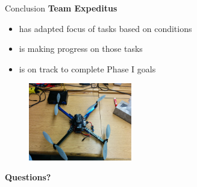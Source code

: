 \documentclass[11pt]{beamer}
\begin{document}
\begin{frame}[t]{Conclusion}
\textbf{Team Expeditus}
\begin{itemize}
\item has adapted focus of tasks based on conditions
\item is making progress on those tasks
\item is on track to complete Phase I goals
\end{itemize}

\begin{figure}
    \centering
    \includegraphics[width=0.4\textwidth]{images/quad}
\end{figure}

\end{frame}

\begin{frame}
\center \Large{{\textbf{Questions?}}}
\end{frame}
\end{document}

